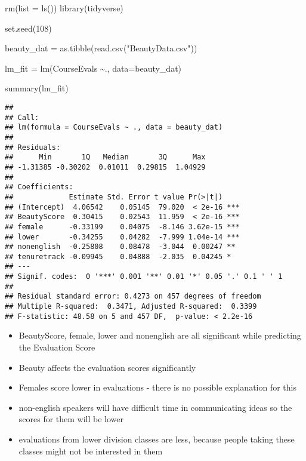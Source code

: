 \documentclass[
]{article}
\newenvironment{Shaded}{\begin{snugshade}}{\end{snugshade}}
\newcommand{\AttributeTok}[1]{\textcolor[rgb]{0.77,0.63,0.00}{#1}}
\newcommand{\DecValTok}[1]{\textcolor[rgb]{0.00,0.00,0.81}{#1}}
\newcommand{\FunctionTok}[1]{\textcolor[rgb]{0.00,0.00,0.00}{#1}}
\newcommand{\NormalTok}[1]{#1}
\newcommand{\OtherTok}[1]{\textcolor[rgb]{0.56,0.35,0.01}{#1}}
\newcommand{\SpecialCharTok}[1]{\textcolor[rgb]{0.00,0.00,0.00}{#1}}
\newcommand{\StringTok}[1]{\textcolor[rgb]{0.31,0.60,0.02}{#1}}
\providecommand{\tightlist}{%
  \setlength{\itemsep}{0pt}\setlength{\parskip}{0pt}}
\begin{document}
\begin{Shaded}
\begin{Highlighting}[]
\FunctionTok{rm}\NormalTok{(}\AttributeTok{list =} \FunctionTok{ls}\NormalTok{())}
\FunctionTok{library}\NormalTok{(tidyverse)}

\FunctionTok{set.seed}\NormalTok{(}\DecValTok{108}\NormalTok{)}

\NormalTok{beauty\_dat }\OtherTok{=} \FunctionTok{as.tibble}\NormalTok{(}\FunctionTok{read.csv}\NormalTok{(}\StringTok{"BeautyData.csv"}\NormalTok{))}

\NormalTok{lm\_fit }\OtherTok{=} \FunctionTok{lm}\NormalTok{(CourseEvals  }\SpecialCharTok{\textasciitilde{}}\NormalTok{., }\AttributeTok{data=}\NormalTok{beauty\_dat)}

\FunctionTok{summary}\NormalTok{(lm\_fit)}
\end{Highlighting}
\end{Shaded}

\begin{verbatim}
## 
## Call:
## lm(formula = CourseEvals ~ ., data = beauty_dat)
## 
## Residuals:
##      Min       1Q   Median       3Q      Max 
## -1.31385 -0.30202  0.01011  0.29815  1.04929 
## 
## Coefficients:
##             Estimate Std. Error t value Pr(>|t|)    
## (Intercept)  4.06542    0.05145  79.020  < 2e-16 ***
## BeautyScore  0.30415    0.02543  11.959  < 2e-16 ***
## female      -0.33199    0.04075  -8.146 3.62e-15 ***
## lower       -0.34255    0.04282  -7.999 1.04e-14 ***
## nonenglish  -0.25808    0.08478  -3.044  0.00247 ** 
## tenuretrack -0.09945    0.04888  -2.035  0.04245 *  
## ---
## Signif. codes:  0 '***' 0.001 '**' 0.01 '*' 0.05 '.' 0.1 ' ' 1
## 
## Residual standard error: 0.4273 on 457 degrees of freedom
## Multiple R-squared:  0.3471, Adjusted R-squared:  0.3399 
## F-statistic: 48.58 on 5 and 457 DF,  p-value: < 2.2e-16
\end{verbatim}

\begin{itemize}
\tightlist
\item
  BeautyScore, female, lower and nonenglish are all significant while
  predicting the Evaluation Score
\item
  Beauty affects the evaluation scores significantly
\item
  Females score lower in evaluations - there is no possible explanation
  for this
\item
  non-english speakers will have difficult time in communicating ideas
  so the scores for them will be lower
\item
  evaluations from lower division classes are less, because people
  taking these classes might not be interested in them
\end{itemize}
\end{document}
